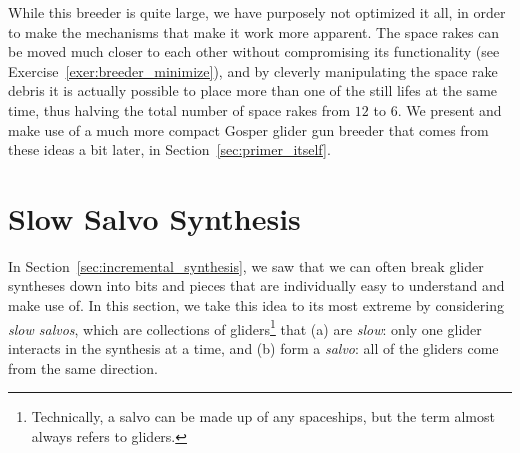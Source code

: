While this breeder is quite large, we have purposely not optimized it all, in order to make the mechanisms that make it work more apparent. The space rakes can be moved much closer to each other without compromising its functionality (see Exercise~\ref{exer:breeder_minimize}), and by cleverly manipulating the space rake debris it is actually possible to place more than one of the still lifes at the same time, thus halving the total number of space rakes from $12$ to $6$. We present and make use of a much more compact Gosper glider gun breeder that comes from these ideas a bit later, in Section~\ref{sec:primer_itself}.



\section{Slow Salvo Synthesis}\label{sec:slow_salvo}

In Section~\ref{sec:incremental_synthesis}, we saw that we can often break glider syntheses down into bits and pieces that are individually easy to understand and make use of. In this section, we take this idea to its most extreme by considering \emph{slow salvos}, which are collections of gliders\footnote{Technically, a salvo can be made up of any spaceships, but the term almost always refers to gliders.} that (a) are \emph{slow}: only one glider interacts in the synthesis at a time, and (b) form a \emph{salvo}: all of the gliders come from the same direction.

